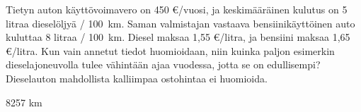 \begin{tehtavasivu}
\begin{tehtava}
	Tietyn auton käyttövoimavero on 450 \euro /vuosi, ja keskimääräinen kulutus on 5 litraa dieselöljyä / 100~km. Saman valmistajan vastaava bensiinikäyttöinen auto kuluttaa 8 litraa / 100~km. Diesel maksaa 1,55 \euro /litra, ja bensiini maksaa 1,65 \euro /litra. Kun vain annetut tiedot huomioidaan, niin kuinka paljon esimerkin dieselajoneuvolla tulee vähintään ajaa vuodessa, jotta se on edullisempi? Dieselauton mahdollista kalliimpaa ostohintaa ei huomioida.
    \begin{vastaus}
        8257 km
    \end{vastaus}
\end{tehtava}

\end{tehtavasivu}

